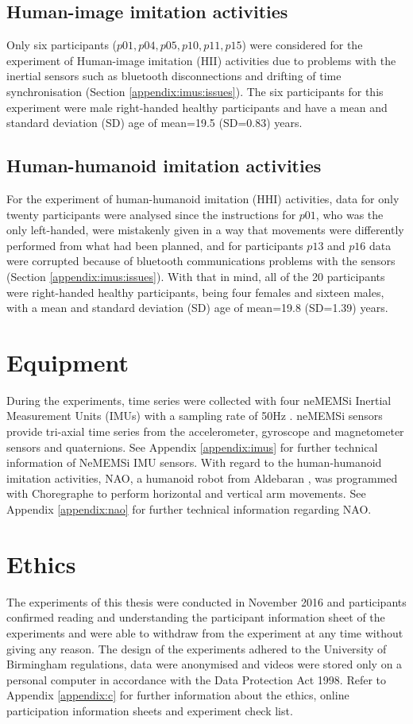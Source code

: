 \subsection{Human-image imitation activities}
Only six participants ($p01, p04, p05, p10, p11, p15$) were considered 
for the experiment of Human-image imitation (HII) activities due to  
problems with the inertial sensors such as bluetooth disconnections and
drifting of time synchronisation (Section \ref{appendix:imus:issues}).
The six participants for this experiment were male right-handed 
healthy participants and have a mean and standard deviation (SD) 
age of mean=19.5 (SD=0.83) years.

\subsection{Human-humanoid imitation activities}
For the experiment of human-humanoid imitation (HHI) activities, 
data for only twenty participants were analysed since the instructions 
for $p01$, who was the only left-handed, were mistakenly given in a way 
that movements were differently performed from what had been planned, 
and for participants $p13$ and $p16$ data were corrupted because of  
bluetooth communications problems with the sensors 
(Section \ref{appendix:imus:issues}).
With that in mind, all of the 20 participants were right-handed 
healthy participants, being four females and sixteen males, with 
a mean and standard deviation (SD) age of mean=19.8 (SD=1.39) years.

\section{Equipment}
During the experiments, time series were collected with four neMEMSi 
Inertial Measurement Units (IMUs) with a sampling rate of 50Hz 
\citep{Comotti2014}. neMEMSi sensors provide tri-axial time series from 
the accelerometer, gyroscope and magnetometer sensors and quaternions.
See Appendix \ref{appendix:imus} for further technical information of 
NeMEMSi IMU sensors.
With regard to the human-humanoid imitation activities, NAO, 
a humanoid robot from Aldebaran \citep{gouaillier2009}, 
was programmed with Choregraphe to perform horizontal and vertical 
arm movements.
See Appendix \ref{appendix:nao} for further technical information 
regarding NAO.

\section{Ethics}
The experiments of this thesis were conducted in November 2016 and
participants confirmed reading and understanding the participant information 
sheet of the experiments and were able to withdraw from the experiment 
at any time without giving any reason.
The design of the experiments adhered to the University of Birmingham 
regulations, data were anonymised and videos were stored 
only on a personal computer in accordance with the Data Protection Act 1998.
Refer to Appendix \ref{appendix:c} for further information about the 
ethics, online participation information sheets and experiment check list.

